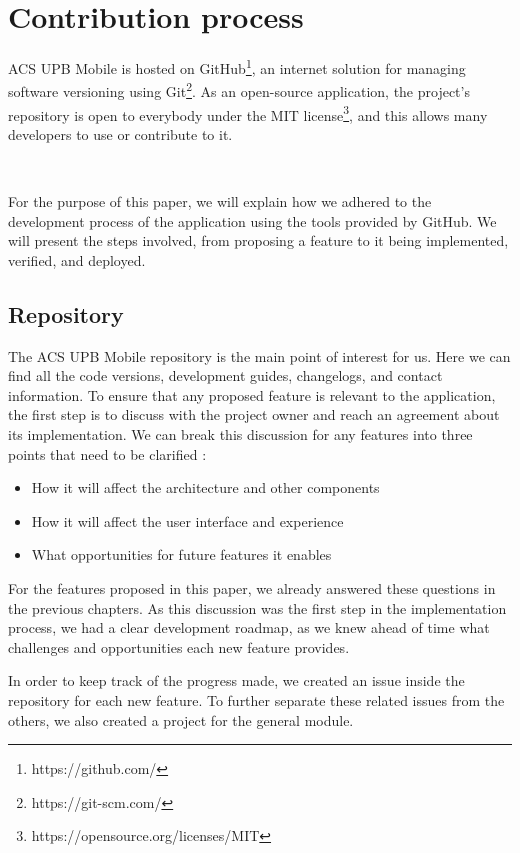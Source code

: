 \chapter{Contribution process} \label{chapter6}
ACS UPB Mobile is hosted on GitHub\footnote{https://github.com/}, an internet solution for managing software versioning using Git\footnote{https://git-scm.com/}. As an open-source application, the project’s repository is open to everybody under the MIT license\footnote{https://opensource.org/licenses/MIT}, and this allows many developers to use or contribute to it.

~

For the purpose of this paper, we will explain how we adhered to the development process of the application using the tools provided by GitHub. We will present the steps involved, from proposing a feature to it being implemented, verified, and deployed. 

\section{Repository} \label{6:repo}
The ACS UPB Mobile repository is the main point of interest for us. Here we can find all the code versions, development guides, changelogs, and contact information. To ensure that any proposed feature is relevant to the application, the first step is to discuss with the project owner and reach an agreement about its implementation.
We can break this discussion for any features into three points that need to be clarified :
\begin{itemize}
            \setlength{\topsep}{0.5pt}
            \setlength{\itemsep}{0.5pt}
            \setlength{\parsep}{0.5pt}
            \item How it will affect the architecture and other components
            \item How it will affect the user interface and experience
            \item What opportunities for future features it enables
\end{itemize}

For the features proposed in this paper, we already answered these questions in the previous chapters. As this discussion was the first step in the implementation process, we had a clear development roadmap, as we knew ahead of time what challenges and opportunities each new feature provides. 

In order to keep track of the progress made, we created an issue inside the repository for each new feature. To further separate these related issues from the others, we also created a project for the general module.

